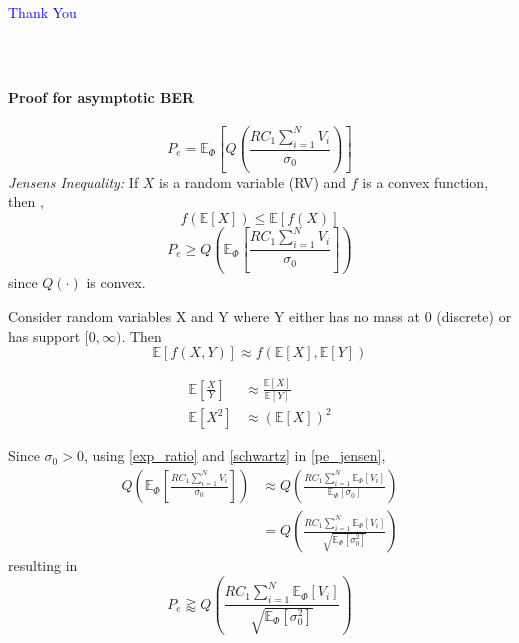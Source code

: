 \documentclass[slidestop,usepdftitle=false]{gvvslides}
\providecommand{\sbrak}[1]{\ensuremath{{}\left[#1\right]}}
\providecommand{\brak}[1]{\ensuremath{\left(#1\right)}}
\begin{document}
\begin{frame}
\centering
\textcolor{blue}{ \LARGE {Thank You}}
\end{frame}

\begin{frame}
\frametitle{\,}
\framesubtitle{Proof for asymptotic BER}
\begin{equation}
\label{ber_cond_one}
P_e  = \mathbb{E}_{\Phi}\sbrak{\textit{Q}\brak{\frac{RC_1\sum_{i=1}^N V_i}{ \sigma_0}}}
\end{equation}
%
{\textit{Jensens Inequality:}}
If $X$ is a random variable (RV) and $f$ is a convex function, then , 
\begin{equation}
f\brak{\mathbb{E}\sbrak{X}} \leq \mathbb{E}\sbrak{f\brak{X}}
\label{jensen}
\end{equation}
%
%
\begin{equation}
\label{pe_jensen}
P_e  \geq \textit{Q}\brak{ \mathbb{E}_{\Phi}\sbrak{\frac{RC_1\sum_{i=1}^NV_i}{\sigma_0}}}
\end{equation}
%
since $Q\brak{\cdot}$ is convex.
%
\end{frame}
\begin{frame}

\begin{lemma}
Consider random variables X and Y where Y either has no mass at 0 (discrete) or has support
$[0,\infty )$. Then 
\begin{equation}
\mathbb{E}\sbrak{f\brak{X,Y}} \approx f\brak{\mathbb{E}\sbrak{X},\mathbb{E}\sbrak{Y}} 
\end{equation}
\end{lemma}
\begin{corollary}
\begin{align}
\label{exp_ratio}
\mathbb{E}\sbrak{\frac{X}{Y}} &\approx \frac{\mathbb{E}\sbrak{X}}{\mathbb{E}\sbrak{Y}}
\\
\mathbb{E}\sbrak{X^2} &\approx  \brak{\mathbb{E}\sbrak{X}}^2
\label{schwartz}
\end{align}
\end{corollary}

\end{frame}
\begin{frame}
%
Since $\sigma_0 > 0$, using \eqref{exp_ratio} and \eqref{schwartz} in \eqref{pe_jensen},
%
\begin{align}
\textit{Q}\brak{ \mathbb{E}_{\Phi}\sbrak{\frac{RC_1\sum_{i=1}^NV_i}{\sigma_0}}} &\approx \textit{Q}\brak{\frac{RC_1\sum_{i=1}^N \mathbb{E}_{\Phi}\sbrak {V_i}}{ \mathbb{E}_{\Phi}\sbrak{\sigma_0}}}
\nonumber \\
&= \textit{Q}\brak{\frac{RC_1\sum_{i=1}^N \mathbb{E}_{\Phi}\sbrak {V_i}}{ \sqrt{\mathbb{E}_{\Phi}\sbrak{\sigma_0^2}}}}
\end{align}
resulting in
\begin{equation}
P_e \gtrapprox \textit{Q}\brak{\frac{RC_1\sum_{i=1}^N \mathbb{E}_{\Phi}\sbrak {V_i}}{ \sqrt{\mathbb{E}_{\Phi}\sbrak{\sigma_0^2}}}}
\end{equation}
%
%
\end{frame}
\end{document}
